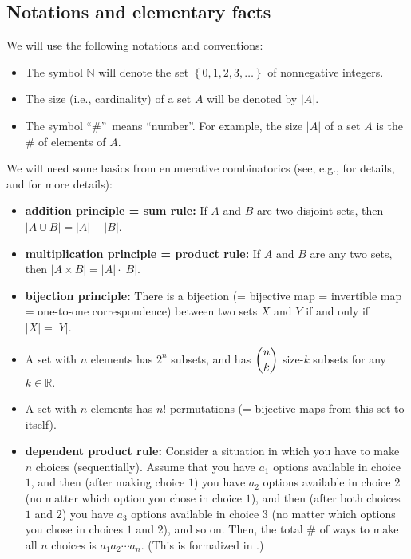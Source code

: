 \subsection{Notations and elementary facts}

We will use the following notations and conventions:

\begin{itemize}
\item The symbol $\mathbb{N}$ will denote the set $\left\{  0,1,2,3,\ldots
\right\}  $ of nonnegative integers.

\item The size (i.e., cardinality) of a set $A$ will be denoted by $\left\vert
A\right\vert $.

\item The symbol \textquotedblleft\#\textquotedblright\ means
\textquotedblleft number\textquotedblright. For example, the size $\left\vert
A\right\vert $ of a set $A$ is the \# of elements of $A$.
\end{itemize}

We will need some basics from enumerative combinatorics (see, e.g.,
\cite[\S 8.1]{Newste19} for details, and \cite[Chapters 1 and 2]{19fco} for
more details):

\begin{itemize}
\item \textbf{addition principle = sum rule:} If $A$ and $B$ are two disjoint
sets, then $\left\vert A\cup B\right\vert =\left\vert A\right\vert +\left\vert
B\right\vert $.

\item \textbf{multiplication principle = product rule:} If $A$ and $B$ are any
two sets, then $\left\vert A\times B\right\vert =\left\vert A\right\vert
\cdot\left\vert B\right\vert $.

\item \textbf{bijection principle:} There is a bijection (= bijective map =
invertible map = one-to-one correspondence) between two sets $X$ and $Y$ if
and only if $\left\vert X\right\vert =\left\vert Y\right\vert $.

\item A set with $n$ elements has $2^{n}$ subsets, and has $\dbinom{n}{k}$
size-$k$ subsets for any $k\in\mathbb{R}$.

\item A set with $n$ elements has $n!$ permutations (= bijective maps from
this set to itself).

\item \textbf{dependent product rule:} Consider a situation in which you have
to make $n$ choices (sequentially). Assume that you have $a_{1}$ options
available in choice $1$, and then (after making choice $1$) you have $a_{2}$
options available in choice $2$ (no matter which option you chose in choice
$1$), and then (after both choices $1$ and $2$) you have $a_{3}$ options
available in choice $3$ (no matter which options you chose in choices $1$ and
$2$), and so on. Then, the total \# of ways to make all $n$ choices is
$a_{1}a_{2}\cdots a_{n}$. (This is formalized in \cite[Theorem 8.1.19]%
{Newste19}.)
\end{itemize}

